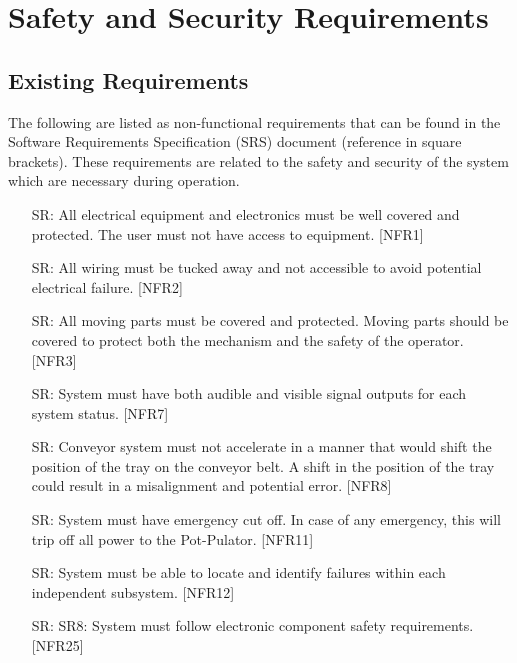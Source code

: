 \documentclass{article}
\newcounter{srreqnum} %
\begin{document}
\newpage

\section{Safety and Security Requirements}

\subsection{Existing Requirements}
The following are listed as non-functional requirements that can be found in 
the Software Requirements Specification (SRS) document (reference in square brackets).
These requirements are related to the safety and security of the system which are necessary during operation.
\\
\begin{itemize}
    \item[SR\refstepcounter{srreqnum}\thesrreqnum \label{SR1}:]
    All electrical equipment and electronics must be well covered and protected. The user must not have access to equipment. [NFR1]
    \item[SR\refstepcounter{srreqnum}\thesrreqnum \label{SR2}:]
    All wiring must be tucked away and not accessible to avoid potential electrical failure. [NFR2]
    \item[SR\refstepcounter{srreqnum}\thesrreqnum \label{SR3}:]
    All moving parts must be covered and protected. Moving parts should be covered to protect both the mechanism and the safety of the operator. [NFR3]
    \item[SR\refstepcounter{srreqnum}\thesrreqnum \label{SR4}:]
    System must have both audible and visible signal outputs for each system status. [NFR7]
    \item[SR\refstepcounter{srreqnum}\thesrreqnum \label{SR5}:]
    Conveyor system must not accelerate in a manner that would shift the position of 
    the tray on the conveyor belt. A shift in the position of the tray could result in a misalignment and potential error. [NFR8]
    \item[SR\refstepcounter{srreqnum}\thesrreqnum \label{SR6}:]
    System must have emergency cut off. In case of any emergency, this will trip off all power to the Pot-Pulator. [NFR11]
    \item[SR\refstepcounter{srreqnum}\thesrreqnum \label{SR7}:]
    System must be able to locate and identify failures within each independent subsystem. [NFR12]
    \item[SR\refstepcounter{srreqnum}\thesrreqnum \label{SR8}:]
    SR8: System must follow electronic component safety requirements. [NFR25]
    
  \end{itemize}
\end{document}
